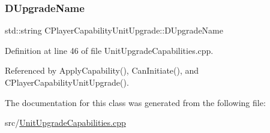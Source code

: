 \subsubsection{\texorpdfstring{D\+Upgrade\+Name}{DUpgradeName}}
{\footnotesize\ttfamily std\+::string C\+Player\+Capability\+Unit\+Upgrade\+::\+D\+Upgrade\+Name\hspace{0.3cm}{\ttfamily [protected]}}



Definition at line 46 of file Unit\+Upgrade\+Capabilities.\+cpp.



Referenced by Apply\+Capability(), Can\+Initiate(), and C\+Player\+Capability\+Unit\+Upgrade().



The documentation for this class was generated from the following file\+:\begin{DoxyCompactItemize}
\item 
src/\hyperlink{UnitUpgradeCapabilities_8cpp}{Unit\+Upgrade\+Capabilities.\+cpp}\end{DoxyCompactItemize}
